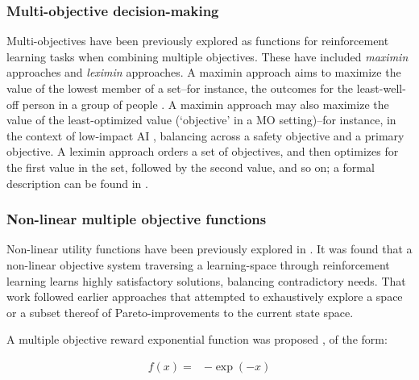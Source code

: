 \subsubsection{Multi-objective decision-making}
Multi-objectives have been previously explored \cite{vamplew_human-aligned_2018,vamplew_potential-based_2021}
as functions for reinforcement learning
tasks when combining multiple objectives. 
These have included \textit{maximin} approaches and \textit{leximin} approaches. A maximin approach aims to maximize the value of the lowest member of a set--for instance, the outcomes for the least-well-off person in a group of people \cite{rawls2001justice}. A maximin approach may also maximize the value of the least-optimized value (`objective' in a MO setting)--for instance, in the context of low-impact AI \cite{vamplew_potential-based_2021}, balancing across a safety objective
and a primary objective. A leximin approach orders a set of objectives, and then optimizes for the first value in the set, followed by the second value, and so on; a formal description can be found in \cite{vamplew_human-aligned_2018}.

\subsubsection{Non-linear multiple objective functions}
Non-linear utility functions have been previously explored in \cite{rolf_need_2020}. It was found that a non-linear objective system traversing a learning-space through reinforcement learning learns highly satisfactory solutions, balancing contradictory needs. That work followed earlier approaches that attempted to exhaustively explore \cite{van2014multi,parisi2016multi} a space or a subset thereof \cite{barrett2008learning} of Pareto-improvements to the current state space.

A multiple objective reward exponential function was proposed \cite{rolf_need_2020}, of the form:

\begin{align}\label{eq:rolf}
f(x)= &  -\exp(-x) \\ \nonumber
\end{align}

